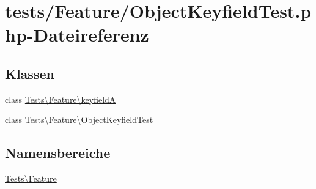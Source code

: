 \hypertarget{ObjectKeyfieldTest_8php}{}\section{tests/\+Feature/\+Object\+Keyfield\+Test.php-\/\+Dateireferenz}
\label{ObjectKeyfieldTest_8php}
\subsection*{Klassen}
\begin{DoxyCompactItemize}
\item 
class \hyperlink{classTests_1_1Feature_1_1keyfieldA}{Tests\textbackslash{}\+Feature\textbackslash{}keyfieldA}
\item 
class \hyperlink{classTests_1_1Feature_1_1ObjectKeyfieldTest}{Tests\textbackslash{}\+Feature\textbackslash{}\+Object\+Keyfield\+Test}
\end{DoxyCompactItemize}
\subsection*{Namensbereiche}
\begin{DoxyCompactItemize}
\item 
 \hyperlink{namespaceTests_1_1Feature}{Tests\textbackslash{}\+Feature}
\end{DoxyCompactItemize}
